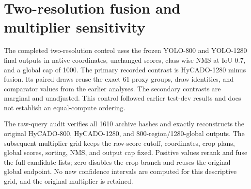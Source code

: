\documentclass[10pt,letterpaper]{article}
\begin{document}
\section{Two-resolution fusion and multiplier sensitivity}
The completed two-resolution control uses the frozen YOLO-800 and YOLO-1280 final outputs in native coordinates, unchanged scores, class-wise NMS at IoU 0.7, and a global cap of 1000. The primary recorded contrast is HyCADO-1280 minus fusion. Its paired draws reuse the exact 61 proxy groups, draw identities, and comparator values from the earlier analyses. The secondary contrasts are marginal and unadjusted. This control followed earlier test-dev results and does not establish an equal-compute ordering.
\begin{table}[h!]
\centering\small\setlength{\tabcolsep}{4pt}
\caption{Two-resolution YOLO fusion on all 1610 test-dev images, COCO-style point metrics.}

\end{table}
\begin{table}[h!]
\centering\small\setlength{\tabcolsep}{4pt}
\caption{Paired differences for the completed fusion control, maxDets100. Intervals are 95\% percentile intervals conditional on the retained trained models.}

\end{table}
\clearpage
The raw-query audit verifies all 1610 archive hashes and exactly reconstructs the original HyCADO-800, HyCADO-1280, and 800-region/1280-global outputs. The subsequent multiplier grid keeps the raw-score cutoff, coordinates, crop plans, global scores, sorting, NMS, and output cap fixed. Positive values rerank and fuse the full candidate lists; zero disables the crop branch and reuses the original global endpoint. No new confidence intervals are computed for this descriptive grid, and the original multiplier is retained.
\begin{table}[h!]
\centering\small\setlength{\tabcolsep}{4pt}
\caption{Complete multiplier sensitivity on test-dev. The original $\alpha=0.25$ reproduces the prior COCO result exactly. No optimal multiplier is selected from this previously examined split.}

\end{table}
\end{document}
